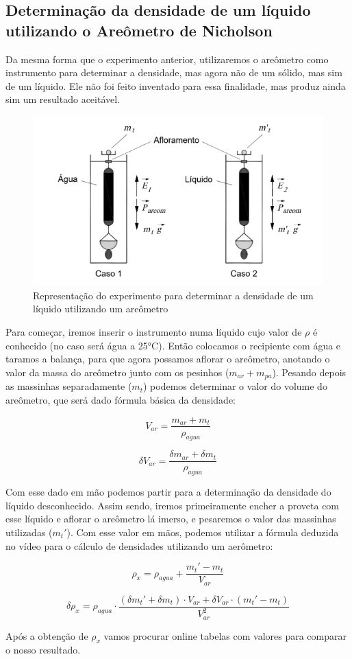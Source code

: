 \subsection{Determinação da densidade de um líquido utilizando o
Areômetro de Nicholson}

Da mesma forma que o experimento anterior, utilizaremos o areômetro como instrumento para determinar a densidade, mas agora não de um sólido, mas sim de um líquido. Ele não foi feito inventado para essa finalidade, mas produz ainda sim um resultado aceitável.

\begin{figure}[H]
    \centering
    \includegraphics[scale=0.8]{images/aerometro-densidade-liquido.png}
    \caption{Representação do experimento para determinar a densidade de um líquido utilizando um areômetro}
\end{figure}

Para começar, iremos inserir o instrumento numa líquido cujo valor de $\rho$ é conhecido (no caso será água a 25°C). Então colocamos o recipiente com água e taramos a balança, para que agora possamos aflorar o areômetro, anotando o valor da massa do areômetro junto com os pesinhos ($m_{ar} + m_{pa}$). Pesando depois as massinhas separadamente ($m_t$) podemos determinar o valor do volume do areômetro, que será dado fórmula básica da densidade:

\[ V_{ar} = \frac{m_{ar} + m_t}{\rho _{agua}} \]

\[ \delta V_{ar} = \frac{\delta m_{ar} + \delta m_t}{\rho _{agua}} \]

Com esse dado em mão podemos partir para a determinação da densidade do líquido desconhecido. Assim sendo, iremos primeiramente encher a proveta com esse líquido e aflorar o areômetro lá imerso, e pesaremos o valor das massinhas utilizadas ($m_t'$). Com esse valor em mãos, podemos utilizar a fórmula deduzida no vídeo para o cálculo de densidades utilizando um aerômetro:

\[ \rho _x = \rho _{agua} + \frac{m_t' - m_t}{V_{ar}} \]

\[ \delta \rho _x = \rho _{agua} \cdot \frac{(\delta m_t' + \delta m_t) \cdot V_{ar} + \delta V_{ar} \cdot (m_t' - m_t)}{V_{ar}^2} \]

Após a obtenção de $\rho _x$ vamos procurar online tabelas com valores para comparar o nosso resultado.
